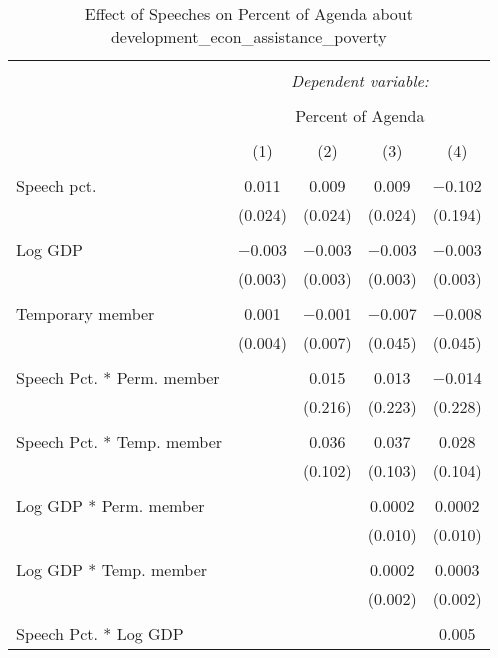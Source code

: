 
\begin{table}[!htbp] \centering 
  \caption{Effect of Speeches on Percent of Agenda about  development_econ_assistance_poverty} 
  \label{} 
\begin{tabular}{@{\extracolsep{5pt}}lcccc} 
\\[-1.8ex]\hline 
\hline \\[-1.8ex] 
 & \multicolumn{4}{c}{\textit{Dependent variable:}} \\ 
\cline{2-5} 
\\[-1.8ex] & \multicolumn{4}{c}{Percent of Agenda} \\ 
\\[-1.8ex] & (1) & (2) & (3) & (4)\\ 
\hline \\[-1.8ex] 
 Speech pct. & 0.011 & 0.009 & 0.009 & $-$0.102 \\ 
  & (0.024) & (0.024) & (0.024) & (0.194) \\ 
  & & & & \\ 
 Log GDP & $-$0.003 & $-$0.003 & $-$0.003 & $-$0.003 \\ 
  & (0.003) & (0.003) & (0.003) & (0.003) \\ 
  & & & & \\ 
 Temporary member & 0.001 & $-$0.001 & $-$0.007 & $-$0.008 \\ 
  & (0.004) & (0.007) & (0.045) & (0.045) \\ 
  & & & & \\ 
 Speech Pct. * Perm. member &  & 0.015 & 0.013 & $-$0.014 \\ 
  &  & (0.216) & (0.223) & (0.228) \\ 
  & & & & \\ 
 Speech Pct. * Temp. member &  & 0.036 & 0.037 & 0.028 \\ 
  &  & (0.102) & (0.103) & (0.104) \\ 
  & & & & \\ 
 Log GDP * Perm. member &  &  & 0.0002 & 0.0002 \\ 
  &  &  & (0.010) & (0.010) \\ 
  & & & & \\ 
 Log GDP * Temp. member &  &  & 0.0002 & 0.0003 \\ 
  &  &  & (0.002) & (0.002) \\ 
  & & & & \\ 
 Speech Pct. * Log GDP &  &  &  & 0.005 \\ 

\end{tabular}
\end{table}
